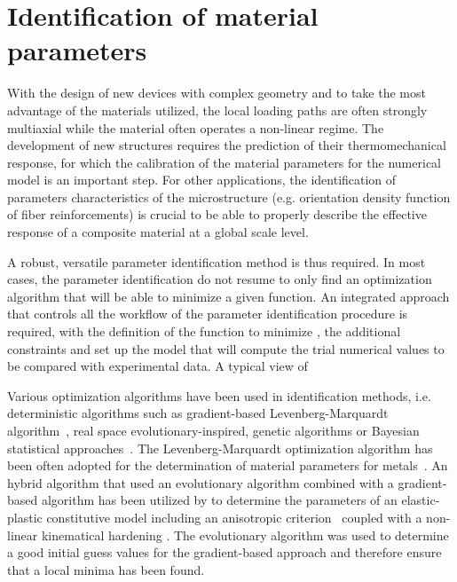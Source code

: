 \chapter{Identification of material parameters}
\label{chap:constitutive_models}

\resumechap{}

\hphantom{a}

With the design of new devices with complex geometry and to take the most advantage of the materials utilized, the local loading paths are often strongly multiaxial while the material often operates a non-linear regime. The development of new structures requires the prediction of their thermomechanical response, for which the calibration of the material parameters for the numerical model is an important step. For other applications, the identification of parameters characteristics of the microstructure (e.g. orientation density function of fiber reinforcements) is crucial to be able to properly describe the effective response of a composite material at a global scale level.

A robust, versatile parameter identification method is thus required. In most cases, the parameter identification do not resume to only find an optimization algorithm that will be able to minimize a given function. An integrated approach that controls all the workflow of the parameter identification procedure is required, with the definition of the function to minimize , the additional constraints and set up the model that will compute the trial numerical values to be compared with experimental data. A typical view of 

Various optimization algorithms have been used in identification methods, i.e. deterministic algorithms such as gradient-based Levenberg-Marquardt algorithm~\citep{Levenberg.1944, Marquardt.1963}, real space evolutionary-inspired, genetic algorithms or Bayesian statistical approaches~\citep{Beck&Arnold.1977}. The Levenberg-Marquardt optimization algorithm has been often adopted for the determination of material parameters for metals~\citep{Springmann&Kuna.2005, Mahnken&Stein.1996, Ghouati&Gelin.1998, Cooreman.etal.2007}. 
An hybrid algorithm that used an evolutionary algorithm combined with a gradient-based algorithm has been utilized by \cite{Chaparro.etal.2008} to determine the parameters of an elastic-plastic constitutive model including an anisotropic criterion~\citep{Barlat.etal.1991} coupled with a non-linear kinematical hardening \citep{Lemaitre&Chaboche.1990}. The evolutionary algorithm was used to determine a good initial guess values for the gradient-based approach and therefore ensure that a local minima has been found.

